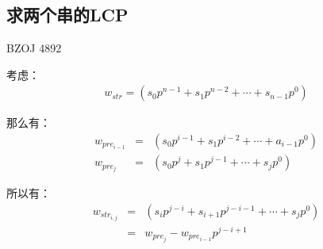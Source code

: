 \subsection{求两个串的LCP}
BZOJ 4892\par
考虑：
\begin{eqnarray*}
w_{str} = (s_0p^{n - 1} + s_1p^{n - 2} + \cdots + s_{n - 1}p^{0})
\end{eqnarray*} \par
那么有：
\begin{eqnarray*}
w_{pre_{i - 1}} &=& (s_0p^{i - 1} + s_1p^{i - 2} + \cdots + a_{i - 1}p^{0}) \\
w_{pre_j} &=& (s_0p^j + s_1p^{j - 1} + \cdots + s_jp^0)
\end{eqnarray*} \par
所以有：
\begin{eqnarray*}
w_{str_{i, j}} &=& (s_ip^{j - i} + s_{i + 1}p^{j - i - 1} + \cdots + s_jp^0) \\
&=& w_{pre_j} - w_{pre_{i - 1}}p^{j - i + 1}
\end{eqnarray*} \par

